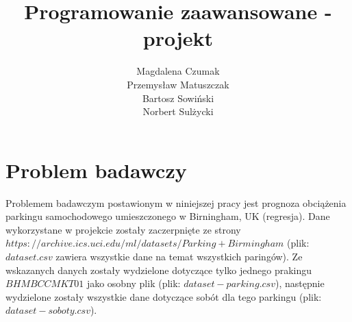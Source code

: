 \documentclass[]{article}
\title{Programowanie zaawansowane - projekt}
\author{Magdalena Czumak \\
Przemysław Matuszczak\\
Bartosz Sowiński\\
Norbert Sulżycki\\
}
\begin{document}
\maketitle



\section{Problem badawczy}
Problemem badawczym postawionym w niniejszej pracy jest prognoza obciążenia parkingu samochodowego umieszczonego w Birningham, UK (regresja). Dane wykorzystane w projekcie zostały zaczerpnięte ze strony\\ $https://archive.ics.uci.edu/ml/datasets/Parking+Birmingham$ (plik: $dataset.csv$ zawiera wszystkie dane na temat wszystkich paringów). Ze wskazanych danych zostały wydzielone dotyczące tylko jednego prakingu $BHMBCCMKT01$ jako osobny plik (plik: $dataset-parking.csv$), następnie wydzielone zostały wszystkie dane dotyczące sobót dla tego parkingu (plik: $dataset-soboty.csv$).
\end{document}
